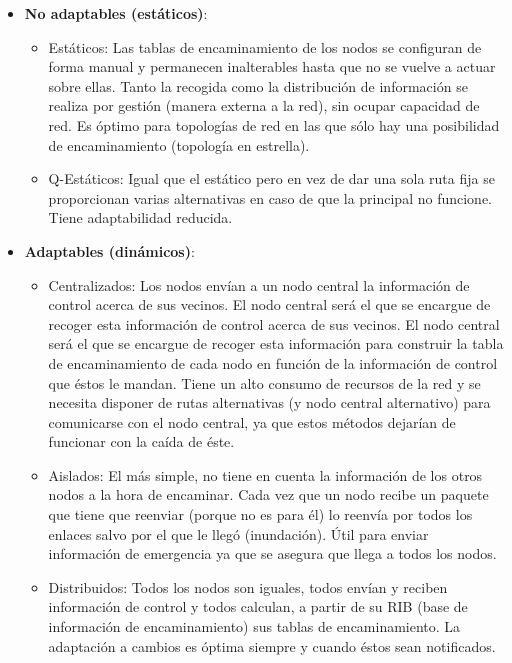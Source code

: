 \documentclass[10pt,portrait, twocolumn]{article}
\begin{document}
	\begin{itemize}
		\item \textbf{No adaptables (estáticos)}:
			\begin{itemize}
				\item Estáticos: Las tablas de encaminamiento de los nodos se configuran de forma manual y permanecen inalterables hasta que no se vuelve a actuar sobre ellas. Tanto la recogida como la distribución de información se realiza por gestión (manera externa a la red), sin ocupar capacidad de red. Es óptimo para topologías de red en las que sólo hay una posibilidad de encaminamiento (topología en estrella).
				\item Q-Estáticos: Igual que el estático pero en vez de dar una sola ruta fija se proporcionan varias alternativas en caso de que la principal no funcione. Tiene adaptabilidad reducida.
			\end{itemize}
		\item \textbf{Adaptables (dinámicos)}:
			\begin{itemize}
				\item Centralizados: Los nodos envían a un nodo central la información de control acerca de sus vecinos. El nodo central será el que se encargue de recoger esta información de control acerca de sus vecinos. El nodo central será el que se encargue de recoger esta información para construir la tabla de encaminamiento de cada nodo en función de la información de control que éstos le mandan. Tiene un alto consumo de recursos de la red y se necesita disponer de rutas alternativas (y nodo central alternativo) para comunicarse con el nodo central, ya que estos métodos dejarían de funcionar con la caída de éste.
				\item Aislados: El más simple, no tiene en cuenta la información de los otros nodos a la hora de encaminar. Cada vez que un nodo recibe un paquete que tiene que reenviar (porque no es para él) lo reenvía por todos los enlaces salvo por el que le llegó (inundación). Útil para enviar información de emergencia ya que se asegura que llega a todos los nodos.
				\item Distribuidos: Todos los nodos son iguales, todos envían y reciben información de control y todos calculan, a partir de su RIB (base de información de encaminamiento) sus tablas de encaminamiento. La adaptación a cambios es óptima siempre y cuando éstos sean notificados.
			\end{itemize}
	\end{itemize}
\end{document}
